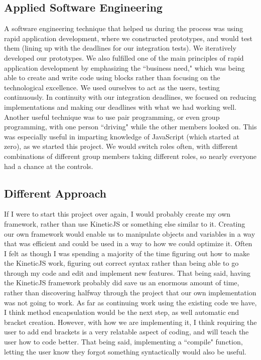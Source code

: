 \documentclass[a4paper]{article}
\begin{document}
\subsection{Applied Software Engineering}
A software engineering technique that helped us during the process was using rapid application development, where we constructed prototypes, and would test them (lining up with the deadlines for our integration tests). We iteratively developed our prototypes. We also fulfilled one of the main principles of rapid application development by emphasizing the ``business need," which was being able to create and write code using blocks rather than focusing on the technological excellence. We used ourselves to act as the users, testing continuously. In continuity with our integration deadlines, we focused on reducing implementations and making our deadlines with what we had working well. Another useful technique was to use pair programming, or even group programming, with one person ``driving" while the other members looked on. This was especially useful in imparting knowledge of JavaScript (which started at zero), as we started this project. We would switch roles often, with different combinations of different group members taking different roles, so nearly everyone had a chance at the controls.
\subsection{Different Approach}
If I were to start this project over again, I would probably create my own framework, rather than use KineticJS or something else similar to it. Creating our own framework would enable us to manipulate objects and variables in a way that was efficient and could be used in a way to how we could optimize it. Often I felt as though I was spending a majority of the time figuring out how to make the KineticJS work, figuring out correct syntax rather than being able to go through my code and edit and implement new features. That being said, having the KineticJS framework probably did save us an enormous amount of time, rather than discovering halfway through the project that our own implementation was not going to work. As far as continuing work using the existing code we have, I think method encapsulation would be the next step, as well automatic end bracket creation. However, with how we are implementing it, I think requiring the user to add end brackets is a very relatable aspect of coding, and will teach the user how to code better. That being said, implementing a ``compile" function, letting the user know they forgot something syntactically would also be useful.
\end{document}
